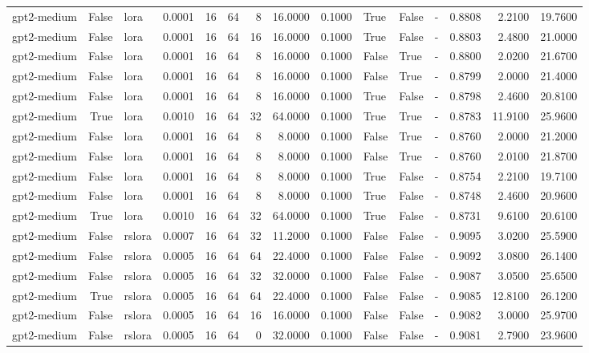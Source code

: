 \begin{tabular}{lrlrrrrrrlllrrr}
gpt2-medium & False & lora & 0.0001 & 16 & 64 & 8 & 16.0000 & 0.1000 & True & False & - & 0.8808 & 2.2100 & 19.7600 \\
gpt2-medium & False & lora & 0.0001 & 16 & 64 & 16 & 16.0000 & 0.1000 & True & False & - & 0.8803 & 2.4800 & 21.0000 \\
gpt2-medium & False & lora & 0.0001 & 16 & 64 & 8 & 16.0000 & 0.1000 & False & True & - & 0.8800 & 2.0200 & 21.6700 \\
gpt2-medium & False & lora & 0.0001 & 16 & 64 & 8 & 16.0000 & 0.1000 & False & True & - & 0.8799 & 2.0000 & 21.4000 \\
gpt2-medium & False & lora & 0.0001 & 16 & 64 & 8 & 16.0000 & 0.1000 & True & False & - & 0.8798 & 2.4600 & 20.8100 \\
gpt2-medium & True & lora & 0.0010 & 16 & 64 & 32 & 64.0000 & 0.1000 & True & True & - & 0.8783 & 11.9100 & 25.9600 \\
gpt2-medium & False & lora & 0.0001 & 16 & 64 & 8 & 8.0000 & 0.1000 & False & True & - & 0.8760 & 2.0000 & 21.2000 \\
gpt2-medium & False & lora & 0.0001 & 16 & 64 & 8 & 8.0000 & 0.1000 & False & True & - & 0.8760 & 2.0100 & 21.8700 \\
gpt2-medium & False & lora & 0.0001 & 16 & 64 & 8 & 8.0000 & 0.1000 & True & False & - & 0.8754 & 2.2100 & 19.7100 \\
gpt2-medium & False & lora & 0.0001 & 16 & 64 & 8 & 8.0000 & 0.1000 & True & False & - & 0.8748 & 2.4600 & 20.9600 \\
gpt2-medium & True & lora & 0.0010 & 16 & 64 & 32 & 64.0000 & 0.1000 & True & False & - & 0.8731 & 9.6100 & 20.6100 \\
gpt2-medium & False & rslora & 0.0007 & 16 & 64 & 32 & 11.2000 & 0.1000 & False & False & - & 0.9095 & 3.0200 & 25.5900 \\
gpt2-medium & False & rslora & 0.0005 & 16 & 64 & 64 & 22.4000 & 0.1000 & False & False & - & 0.9092 & 3.0800 & 26.1400 \\
gpt2-medium & False & rslora & 0.0005 & 16 & 64 & 32 & 32.0000 & 0.1000 & False & False & - & 0.9087 & 3.0500 & 25.6500 \\
gpt2-medium & True & rslora & 0.0005 & 16 & 64 & 64 & 22.4000 & 0.1000 & False & False & - & 0.9085 & 12.8100 & 26.1200 \\
gpt2-medium & False & rslora & 0.0005 & 16 & 64 & 16 & 16.0000 & 0.1000 & False & False & - & 0.9082 & 3.0000 & 25.9700 \\
gpt2-medium & False & rslora & 0.0005 & 16 & 64 & 0 & 32.0000 & 0.1000 & False & False & - & 0.9081 & 2.7900 & 23.9600 \\

\end{tabular}
